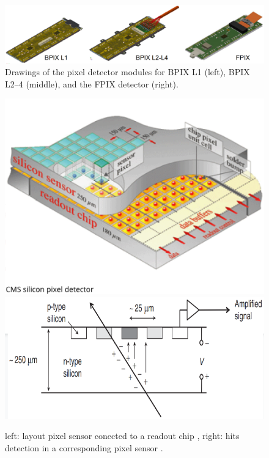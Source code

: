 \begin{center}
  \begin{figure}[h]
    \centering
    \includegraphics[scale=.2]{Chapter2/modules_drawing.png}
    \caption[Pixel detector modules]{ Drawings of the pixel detector modules for BPIX L1 (left), BPIX L2–4 (middle), and the FPIX detector (right)\cite{phase1_Pixel_Detector}.}
    \label{modules_drawing}
  \end{figure}
\end{center}

\begin{center}
  \begin{figure}[h]
    \centering
    \includegraphics[scale=.3]{Chapter2/PixelSensor.png} \includegraphics[scale=.3]{Chapter2/hit.png}
    \caption[PixelSensor]{ left: layout pixel sensor conected to a readout chip , right: hits detection in a corresponding  pixel sensor \citep{thomson_2013}. }
    \label{module and hit}
  \end{figure}
\end{center}

